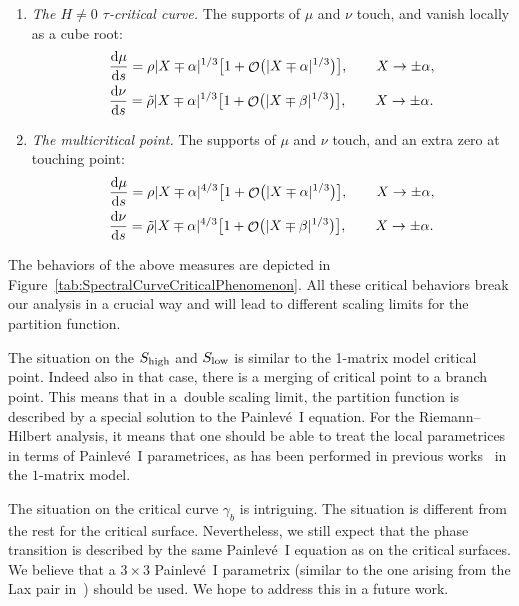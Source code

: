 \documentclass[10pt,a4paper]{amsart}
\DeclareMathOperator{\OO}{\mathcal{O}}
\numberwithin{equation}{section}
\begin{document}
\begin{enumerate}
\begin{align*}
 \end{align*}
 \item \textit{The $H\neq 0$ $\tau$-critical curve.}
 The supports of $\mu$ and $\nu$ touch, and vanish locally as a cube root:
 \begin{align*}
 &\frac{{\rm d}\mu}{{\rm d}s}= \rho |X\mp\alpha|^{1/3}\bigl[1 + \OO\bigl(|X\mp\alpha|^{1/3}\bigr)\bigr], \qquad X\to \pm\alpha,\\
 &\frac{{\rm d}\nu}{{\rm d}s}= \tilde{\rho} |X\mp\alpha|^{1/3}\bigl[1 + \OO\bigl(|X\mp\beta|^{1/3}\bigr)\bigr], \qquad X\to \pm\alpha.
 \end{align*}
 \item \textit{The multicritical point.}
 The supports of $\mu$ and $\nu$ touch, and an extra zero at touching point:
 \begin{align*}
 &\frac{{\rm d}\mu}{{\rm d}s}= \rho |X\mp\alpha|^{4/3}\bigl[1 + \OO\bigl(|X\mp\alpha|^{1/3}\bigr)\bigr], \qquad X\to \pm\alpha,\\
 &\frac{{\rm d}\nu}{{\rm d}s}= \tilde{\rho} |X\mp\alpha|^{4/3}\bigl[1 + \OO\bigl(|X\mp\beta|^{1/3}\bigr)\bigr], \qquad X\to \pm\alpha.
 \end{align*}
 \end{enumerate}


The behaviors of the above measures are depicted in Figure~\ref{tab:SpectralCurveCriticalPhenomenon}. All these critical behaviors break our analysis in a crucial way and will lead to different scaling limits for the partition function.


The situation on the $S_{{\rm high}}$ and $S_{{\rm low}}$ is similar to the 1-matrix model critical point. Indeed also in that case, there is a merging of critical point to a branch point. This means that in a~double scaling limit, the partition function is described by a special solution to the Painlev\'e~I equation. For the Riemann--Hilbert analysis, it means that one should be able to treat the local parametrices in terms of Painlev\'{e}~I parametrices, as has been
 performed in previous works~\cite{BleherDeano, DK0} in the $1$-matrix model.

The situation on the critical curve $\gamma_b$ is intriguing. The situation is different from the rest for the critical surface. Nevertheless, we still expect that the phase transition is described by the same Painlev\'e~I equation as on the critical surfaces. We believe that a $3\times 3$ Painlev\'{e}~I parametrix (similar to the one arising from the Lax pair in~\cite{JKT}) should be used. We hope to address this in a future work.
\end{document}
